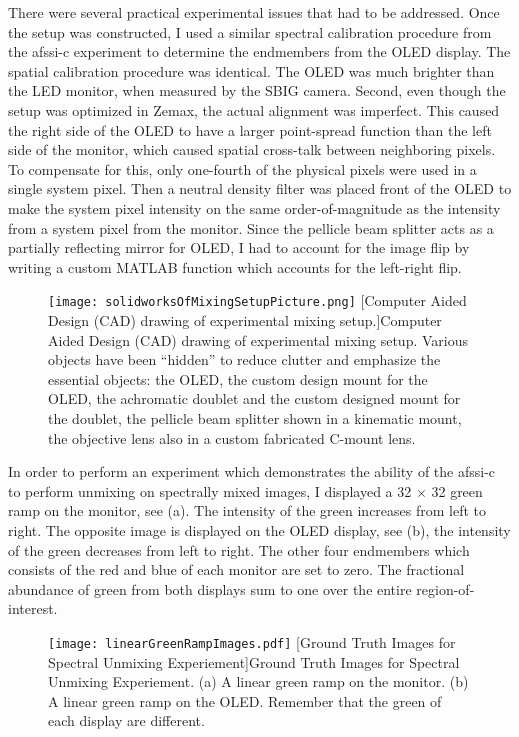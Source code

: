 There were several practical experimental issues that had to be addressed. Once the setup was constructed, I used a similar spectral calibration procedure from the \gls{afssi-c} experiment to determine the endmembers from the OLED display. The spatial calibration procedure was identical. The OLED was much brighter than the LED monitor, when measured by the SBIG camera. Second, even though the setup was optimized in Zemax, the actual alignment was imperfect. This caused the right side of the OLED to have a larger point-spread function than the left side of the monitor, which caused spatial cross-talk between neighboring pixels. To compensate for this, only one-fourth of the physical pixels were used in a single system pixel. Then a neutral density filter was placed front of the OLED to make the system pixel intensity on the same order-of-magnitude as the intensity from a system pixel from the monitor. Since the pellicle beam splitter acts as a partially reflecting mirror for OLED, I had to account for the image flip by writing a custom MATLAB function which accounts for the left-right flip. 

\begin{figure}
	\centering
	\texttt{[image: solidworksOfMixingSetupPicture.png]}
	[Computer Aided Design (CAD) drawing of experimental mixing setup.]{Computer Aided Design (CAD) drawing of experimental mixing setup. Various objects have been ``hidden'' to reduce clutter and emphasize the essential objects: the OLED, the custom design mount for the OLED, the achromatic doublet and the custom designed mount for the doublet, the pellicle beam splitter shown in a kinematic mount, the objective lens also in a custom fabricated C-mount lens.}
	\label{fig:solidworksOfMixingSetupPicture} 
\end{figure}

In order to perform an experiment which demonstrates the ability of the \gls{afssi-c} to perform unmixing on spectrally mixed images, I displayed a 32 $\times$ 32 green ramp on the monitor, see (a). The intensity of the green increases from left to right. The opposite image is displayed on the OLED display, see (b), the intensity of the green decreases from left to right. The other four endmembers which consists of the red and blue of each monitor are set to zero. The fractional abundance of green from both displays sum to one over the entire region-of-interest. 


\begin{figure}
	\centering
	\texttt{[image: linearGreenRampImages.pdf]}
	[Ground Truth Images for Spectral Unmixing Experiement]{Ground Truth Images for Spectral Unmixing Experiement. (a) A linear green ramp on the monitor. (b) A linear green ramp on the OLED. Remember that the green of each display are different.}
	\label{fig:linearGreenRampImages} 
\end{figure}

